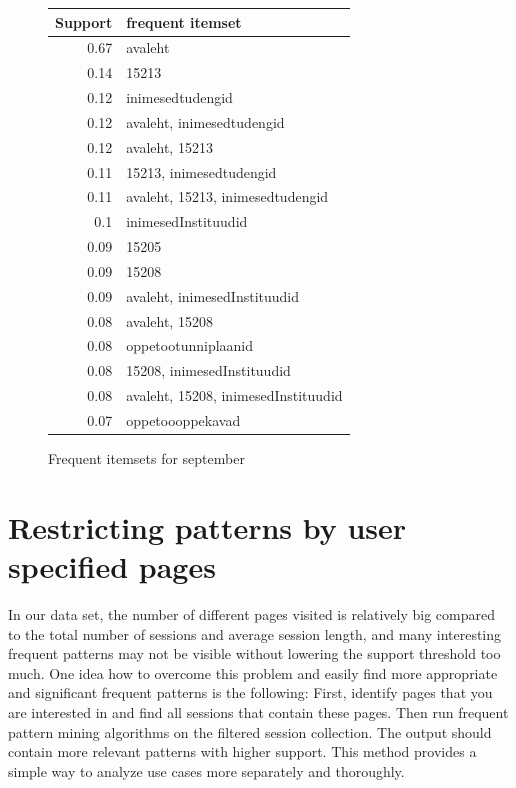 \documentclass[12pt, english,a4paper]{article}
\begin{document}
\begin{figure}[H]
  \centering
\begin{tabular}{ r | l }
Support & frequent itemset \\ \hline
0.67 & avaleht \\ \hline
0.14 & 15213 \\ \hline
0.12 & inimesedtudengid \\ \hline
0.12 & avaleht, inimesedtudengid \\ \hline
0.12 & avaleht, 15213 \\ \hline
0.11 & 15213, inimesedtudengid \\ \hline
0.11 & avaleht, 15213, inimesedtudengid \\ \hline
0.1 & inimesedInstituudid \\ \hline
0.09 & 15205 \\ \hline
0.09 & 15208 \\ \hline
0.09 & avaleht, inimesedInstituudid \\ \hline
0.08 & avaleht, 15208 \\ \hline
0.08 & oppetootunniplaanid \\ \hline
0.08 & 15208, inimesedInstituudid \\ \hline
0.08 & avaleht, 15208, inimesedInstituudid \\ \hline
0.07 & oppetoooppekavad \\ \hline
\end{tabular}
  \caption{Frequent itemsets for september }
  \label{sep2}
\end{figure}


\section{Restricting patterns by user specified pages}
In our data set, the number of different pages visited is relatively big compared to the total number of sessions and average session length, and many interesting frequent patterns may not be visible without lowering the support threshold too much. One idea how to overcome this problem and easily find more appropriate and significant frequent patterns is the following: First, identify pages that you are interested in and find all sessions that contain these pages. Then run frequent pattern mining algorithms on the filtered session collection. The output should contain more relevant patterns with higher support. This method provides a simple way to analyze use cases more separately and thoroughly.
\end{document}

